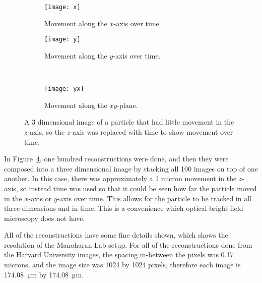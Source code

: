 \begin{figure}[ht!]
    \begin{center}

        \begin{subfigure}[t]{0.4\textwidth}
            \label{fig:3Dx}
            \texttt{[image: x]}
            \caption{Movement along the $x$-axis over time.}
        \end{subfigure}
        \hspace*{\fill}
        \begin{subfigure}[t]{0.4\textwidth}
            \label{fig:3Dy}
            \texttt{[image: y]}
            \caption{Movement along the $y$-axis over time.}
        \end{subfigure}
        \\
        \begin{subfigure}[t]{0.6\textwidth}
            \label{fig:3Dyx}
            \texttt{[image: yx]}
            \caption{Movement along the $xy$-plane.}
        \end{subfigure}


    \end{center}
    \caption{%
        A 3 dimensional image of a particle that had little movement in the
        $z$-axis, so the $z$-axis was replaced with time to show movement over
        time.
    }%
    \label{fig:3D}
\end{figure}

In Figure~\ref{fig:3D}, one hundred reconstructions were done, and then they
were composed into a three dimensional image by stacking all 100 images on top
of one another. In this case, there was approximately a 1 micron movement in
the $z$-axis, so instead time was used so that it could be seen how far the
particle moved in the $x$-axis  or $y$-axis over time. This allows for the
particle to be tracked in all three dimensions and in time. This is a
convenience which optical bright field microscopy does not have.


All of the reconstructions have some fine details shown, which shows the
resolution of the Manoharan Lab setup. For all of the
reconstructions done from the Harvard University images, the spacing in-between
the pixels was 0.17 microns, and the image size was 1024 by 1024 pixels,
therefore each image is \SI{174.08}{\micro\meter} by \SI{174.08}{\micro\meter}.




%
